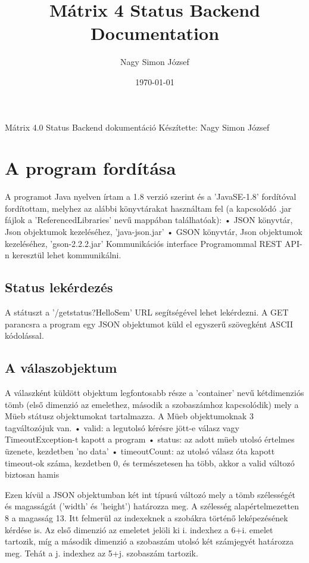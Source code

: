 \documentclass[a4paper,12pt]{article}
\begin{document}
\title{Mátrix 4 Status Backend Documentation}
\author{Nagy Simon József}
\date{\today}
\maketitle

Mátrix 4.0 Status Backend dokumentáció
Készítette: Nagy Simon József
\chapter{A program fordítása}

A programot Java nyelven írtam a 1.8 verzió szerint és a ’JavaSE-1.8’ fordítóval fordítottam, melyhez az alábbi könyvtárakat használtam fel (a kapcsolódó .jar fájlok a ’ReferencedLibraries’ nevű mappában találhatóak):
•	JSON könyvtár, Json objektumok kezeléséhez, ’java-json.jar’
•	GSON könyvtár, Json objektumok kezeléséhez,  ’gson-2.2.2.jar’
Kommunikációs interface
Programommal REST API-n keresztül lehet kommunikálni.
\section{Status lekérdezés}
A státuszt a ’/getstatus?HelloSem’ URL segítségével lehet lekérdezni. A GET parancsra a program egy JSON objektumot küld el egyszerű szövegként ASCII kódolással.
\section{A válaszobjektum}
A válaszként küldött objektum legfontosabb része a ’container’ nevű kétdimenziós tömb (első dimenzió az emelethez, második a szobaszámhoz kapcsolódik) mely a Müeb státusz objektumokat tartalmazza.
A Müeb objektumoknak 3 tagváltozójuk van.
•	valid: a legutolsó kérésre jött-e válasz vagy TimeoutException-t kapott a program
•	status: az adott müeb utolsó értelmes üzenete, kezdetben ’no data’
•	timeoutCount: az utolsó válasz óta kapott timeout-ok száma, kezdetben 0, és természetesen ha több, akkor a valid változó biztosan hamis

Ezen kívül a JSON objektumban két int típusú változó mely a tömb szélességét és magasságát (’width’ és ’height’) határozza meg. A szélesség alapértelmezetten 8 a magasság 13. Itt felmerül az indexeknek a szobákra történő leképezésének kérdése is. Az első dimenzió az emeletet jelöli ki i. indexhez a 6+i. emelet tartozik, míg a második dimenzió a szobaszám utolsó két számjegyét határozza meg. Tehát a j. indexhez az 5+j. szobaszám tartozik. 
\end{document}
